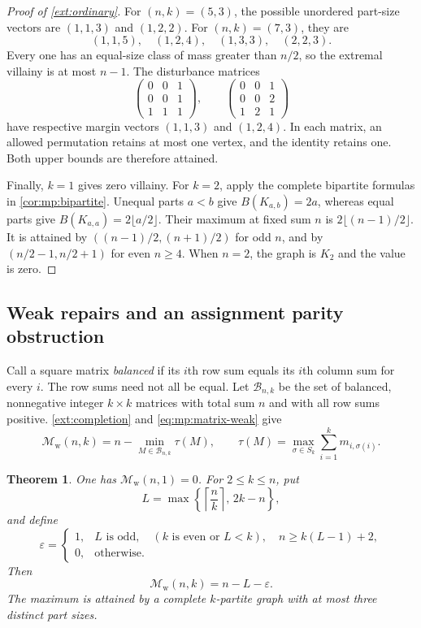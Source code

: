 \documentclass[10pt,a4paper]{amsart}
\numberwithin{equation}{section}
\newtheorem{theorem}{Theorem}[section]
\theoremstyle{definition}
\theoremstyle{remark}
\begin{document}
\begin{proof}[Proof of \cref{ext:ordinary}]
For $(n,k)=(5,3)$, the possible unordered part-size vectors are
$(1,1,3)$ and $(1,2,2)$.  For $(n,k)=(7,3)$, they are
\[
 (1,1,5),\quad (1,2,4),\quad (1,3,3),\quad (2,2,3).
\]
Every one has an equal-size class of mass greater than $n/2$, so the
extremal villainy is at most $n-1$.  The disturbance matrices
\[
 \begin{pmatrix}0&0&1\\0&0&1\\1&1&1\end{pmatrix},
 \qquad
 \begin{pmatrix}0&0&1\\0&0&2\\1&2&1\end{pmatrix}
\]
have respective margin vectors $(1,1,3)$ and $(1,2,4)$.  In each
matrix, an allowed permutation retains at most one vertex, and the
identity retains one.  Both upper bounds are therefore attained.

Finally, $k=1$ gives zero villainy.  For $k=2$, apply the complete
bipartite formulas in \cref{cor:mp:bipartite}.  Unequal
parts $a<b$ give $B(K_{a,b})=2a$, whereas equal parts give
$B(K_{a,a})=2\lfloor a/2\rfloor$.  Their maximum at fixed sum $n$
is $2\lfloor(n-1)/2\rfloor$.  It is attained by
$((n-1)/2,(n+1)/2)$ for odd $n$, and by
$(n/2-1,n/2+1)$ for even $n\ge4$.  When $n=2$, the graph is $K_2$
and the value is zero.
\end{proof}

\subsection{Weak repairs and an assignment parity obstruction}

Call a square matrix \emph{balanced} if its $i$th row sum equals its
$i$th column sum for every $i$.  The row sums need not all be equal.
Let $\mathcal B_{n,k}$ be the set of balanced, nonnegative integer
$k\times k$ matrices with total sum $n$ and with all row sums positive.
\cref{ext:completion} and \eqref{eq:mp:matrix-weak} give
\begin{equation}
\label{ext:weak-matrix}
 \mathcal M_{\mathrm w}(n,k)
   =n-\min_{M\in\mathcal B_{n,k}}\tau(M),
 \qquad
 \tau(M)=\max_{\sigma\in S_k}\sum_{i=1}^k m_{i,\sigma(i)}.
\end{equation}

\begin{theorem}
\label{ext:weak}
One has $\mathcal M_{\mathrm w}(n,1)=0$.  For $2\le k\le n$, put
\[
 L=\max\left\{\left\lceil\frac nk\right\rceil,\,2k-n\right\},
\]
and define
\[
 \varepsilon=
 \begin{cases}
  1,& L\text{ is odd},\quad (k\text{ is even or }L<k),
       \quad n\ge k(L-1)+2,\\
  0,&\text{otherwise}.
 \end{cases}
\]
Then
\[
 \mathcal M_{\mathrm w}(n,k)=n-L-\varepsilon.
\]
The maximum is attained by a complete $k$-partite graph with at most
three distinct part sizes.
\end{theorem}
\end{document}
